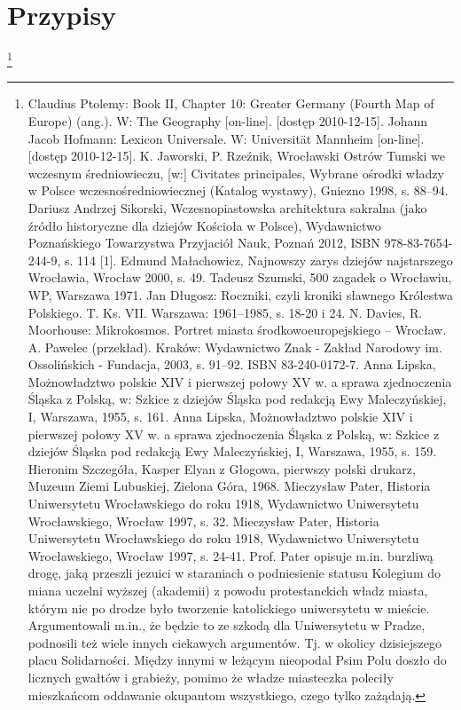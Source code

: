 \documentclass{article}
\begin{document}
\section{Przypisy}
\footnote{ Claudius Ptolemy: Book II, Chapter 10: Greater Germany (Fourth Map of Europe) (ang.). W: The Geography [on-line]. [dostęp 2010-12-15].
 Johann Jacob Hofmann: Lexicon Universale. W: Universität Mannheim [on-line]. [dostęp 2010-12-15].
 K. Jaworski, P. Rzeźnik, Wrocławski Ostrów Tumski we wczesnym średniowieczu, [w:] Civitates principales, Wybrane ośrodki władzy w Polsce wczesnośredniowiecznej (Katalog wystawy), Gniezno 1998, s. 88–94.
 Dariusz Andrzej Sikorski, Wczesnopiastowska architektura sakralna (jako źródło historyczne dla dziejów Kościoła w Polsce), Wydawnictwo Poznańskiego Towarzystwa Przyjaciół Nauk, Poznań 2012, ​ISBN 978-83-7654-244-9​, s. 114 [1].
 Edmund Małachowicz, Najnowszy zarys dziejów najstarszego Wrocławia, Wrocław 2000, s. 49.
 Tadeusz Szumski, 500 zagadek o Wrocławiu, WP, Warszawa 1971.
 Jan Długosz: Roczniki, czyli kroniki sławnego Królestwa Polskiego. T. Ks. VII. Warszawa: 1961–1985, s. 18-20 i 24.
 N. Davies, R. Moorhouse: Mikrokosmos. Portret miasta środkowoeuropejskiego – Wrocław. A. Pawelec (przekład). Kraków: Wydawnictwo Znak - Zakład Narodowy im. Ossolińskich - Fundacja, 2003, s. 91–92. ISBN 83-240-0172-7.
 Anna Lipska, Możnowładztwo polskie XIV i pierwszej połowy XV w. a sprawa zjednoczenia Śląska z Polską, w: Szkice z dziejów Śląska pod redakcją Ewy Maleczyńskiej, I, Warszawa, 1955, s. 161.
 Anna Lipska, Możnowładztwo polskie XIV i pierwszej połowy XV w. a sprawa zjednoczenia Śląska z Polską, w: Szkice z dziejów Śląska pod redakcją Ewy Maleczyńskiej, I, Warszawa, 1955, s. 159.
 Hieronim Szczegóła, Kasper Elyan z Głogowa, pierwszy polski drukarz, Muzeum Ziemi Lubuskiej, Zielona Góra, 1968.
 Mieczysław Pater, Historia Uniwersytetu Wrocławskiego do roku 1918, Wydawnictwo Uniwersytetu Wrocławskiego, Wrocław 1997, s. 32.
 Mieczysław Pater, Historia Uniwersytetu Wrocławskiego do roku 1918, Wydawnictwo Uniwersytetu Wrocławskiego, Wrocław 1997, s. 24-41. Prof. Pater opisuje m.in. burzliwą drogę, jaką przeszli jezuici w staraniach o podniesienie statusu Kolegium do miana uczelni wyższej (akademii) z powodu protestanckich władz miasta, którym nie po drodze było tworzenie katolickiego uniwersytetu w mieście. Argumentowali m.in., że będzie to ze szkodą dla Uniwersytetu w Pradze, podnosili też wiele innych ciekawych argumentów.
 Tj. w okolicy dzisiejszego placu Solidarności.
 Między innymi w leżącym nieopodal Psim Polu doszło do licznych gwałtów i grabieży, pomimo że władze miasteczka poleciły mieszkańcom oddawanie okupantom wszystkiego, czego tylko zażądają.
}
\end{document}
